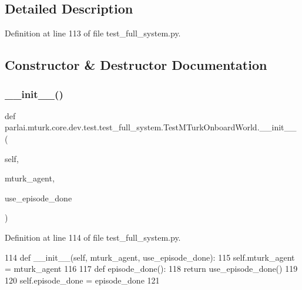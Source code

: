 \subsection{Detailed Description}


Definition at line 113 of file test\+\_\+full\+\_\+system.\+py.



\subsection{Constructor \& Destructor Documentation}
\mbox{\label{classparlai_1_1mturk_1_1core_1_1dev_1_1test_1_1test__full__system_1_1TestMTurkOnboardWorld_a4488b20bd652972be39ed450e41cc5ff}} 
\subsubsection{\texorpdfstring{\+\_\+\+\_\+init\+\_\+\+\_\+()}{\_\_init\_\_()}}
{\footnotesize\ttfamily def parlai.\+mturk.\+core.\+dev.\+test.\+test\+\_\+full\+\_\+system.\+Test\+M\+Turk\+Onboard\+World.\+\_\+\+\_\+init\+\_\+\+\_\+ (\begin{DoxyParamCaption}\item[{}]{self,  }\item[{}]{mturk\+\_\+agent,  }\item[{}]{use\+\_\+episode\+\_\+done }\end{DoxyParamCaption})}



Definition at line 114 of file test\+\_\+full\+\_\+system.\+py.


\begin{DoxyCode}
114     \textcolor{keyword}{def }\_\_init\_\_(self, mturk\_agent, use\_episode\_done):
115         self.mturk\_agent = mturk\_agent
116 
117         \textcolor{keyword}{def }episode\_done():
118             \textcolor{keywordflow}{return} use\_episode\_done()
119 
120         self.episode\_done = episode\_done
121 
\end{DoxyCode}



